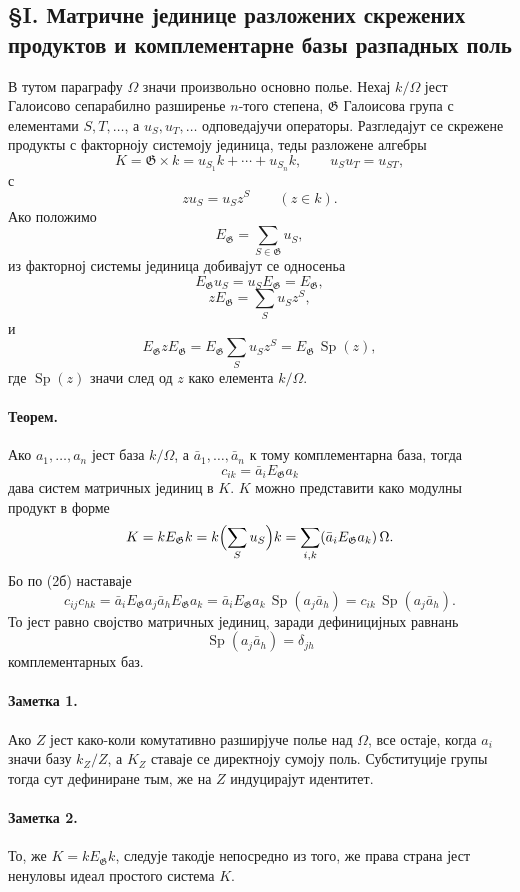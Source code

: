 ﻿\documentclass[11pt]{article}
\providecommand{\Sp}{\operatorname{Sp}}
\providecommand{\Gg}{\mathfrak G}
\begin{document}
\subsection*{§I. Матричне јединице разложених скрежених продуктов и комплементарне базы разпадных поль}

В тутом параграфу \(\Omega\) значи произвольно основно полье. Нехај \(k/\Omega\) јест Галоисово сепарабилно разширенье \(n\)-того степена, \(\Gg\) Галоисова група с елементами \(S,T,\ldots\), а \(u_S,u_T,\ldots\) одповедајучи операторы. Разгледајут се скрежене продукты с факторноју системоју јединица, теды разложене алгебры
\[
        K=\Gg\times k=u_{S_1}k+\cdots+u_{S_n}k,\qquad
        u_Su_T=u_{ST},
\]
с
\[
        z u_S=u_S z^S \qquad(z\in k).
\]
Ако положимо
\[
        E_\Gg=\sum_{S\in\Gg}u_S,
\]
из факторној системы јединица добивајут се односеньа
\[
        E_\Gg u_S=u_S E_\Gg=E_\Gg,                            \tag{1}
\]
\[
        zE_\Gg=\sum_Su_Sz^S,                                  \tag{2a}
\]
и
\[
        E_\Gg z E_\Gg
        =E_\Gg\sum_Su_Sz^S
        =E_\Gg\,\Sp(z),                                      \tag{2b}
\]
где \(\Sp(z)\) значи след од \(z\) како елемента \(k/\Omega\).

\paragraph{Теорем.}
Ако \(a_1,\ldots,a_n\) јест база \(k/\Omega\), а \(\bar a_1,\ldots,\bar a_n\) к тому комплементарна база, тогда
\[
        c_{ik}=\bar a_iE_\Gg a_k
\]
дава систем матричных јединиц в \(K\). \(K\) можно представити како модулны продукт в форме
\[
        K=kE_\Gg k
          =k\Bigl(\sum_Su_S\Bigr)k
          =\sum_{i,k}(\bar a_iE_\Gg a_k)\,\Omega .
\]
Бо по (2б) наставаје
\[
        c_{ij}c_{hk}
        =\bar a_iE_\Gg a_j\bar a_hE_\Gg a_k
        =\bar a_iE_\Gg a_k\,\Sp(a_j\bar a_h)
        =c_{ik}\,\Sp(a_j\bar a_h).
\]
То јест равно својство матричных јединиц, заради дефиницијных равнань
\[
        \Sp(a_j\bar a_h)=\delta_{jh}
\]
комплементарных баз.

\paragraph{Заметка 1.}
Ако \(Z\) јест како-коли комутативно разширјуче полье над \(\Omega\), все остаје, когда \(a_i\) значи базу \(k_Z/Z\), а \(K_Z\) ставаје се директноју сумоју поль. Субституције групы тогда сут дефиниране тым, же на \(Z\) индуцирајут идентитет.

\paragraph{Заметка 2.}
То, же \(K=kE_\Gg k\), следује такодје непосредно из того, же права страна јест ненуловы идеал простого система \(K\).
\end{document}
